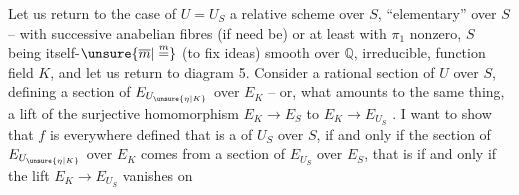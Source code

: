 Let us return to the case of $U=U_S$ a relative scheme over $S$, ``elementary'' over $S$ -- with successive anabelian fibres (if need be) or at least with $\pi_1$ nonzero, $S$ being itself-$\unsure{\overline m|\overset{m}{=}}$ (to fix ideas) smooth over $\mathbb{Q}$, irreducible, function field $K$, and let us return to diagram 5. Consider a rational section  of $U$ over $S$, defining a section of $E_{U_{\unsure{\eta|K}}}$ over $E_K$ -- or, what amounts to the same thing, a lift of the surjective homomorphism $E_K\longrightarrow E_S$ to $E_K\longrightarrow E_{U_S}$ . I want to show that $f$ is everywhere defined that is a   of $U_S$ over $S$, if and only if the section of $E_{U_{\unsure{\eta|K}}}$ over $E_K$ comes from a section of $E_{U_S}$ over $E_S$, that is if and only if the lift $E_K\longrightarrow E_{U_S}$ vanishes on
